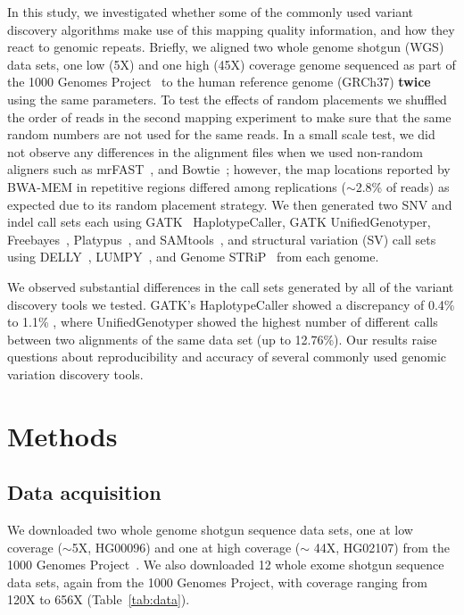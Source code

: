\documentclass[10pt,a4paper]{article}
\begin{document}
In this study, we investigated whether some of the commonly used variant discovery algorithms
make use of this mapping quality information, and how they react to genomic repeats.
Briefly, 
we aligned two whole genome shotgun (WGS) data sets, one low (5X) and one high (45X) coverage genome
sequenced as part of the 1000 Genomes Project~\cite{1000GP2012} to the human reference genome (GRCh37) {\bf twice} using the same parameters. 
To test the effects of random placements 
we shuffled the order of reads in the second mapping experiment to make sure that the same random numbers are not used for the same reads. 
In a small scale test, we did not observe any differences
in the alignment files when we used non-random aligners such as mrFAST~\cite{Alkan2009,Xin2013}, and Bowtie~\cite{Langmead2009}; however, 
the map locations reported by BWA-MEM in repetitive regions differed among replications ($\sim$2.8\% of reads) as expected due to its random placement strategy.
We then generated two SNV and indel call sets each using GATK~\cite{DePristo2011} HaplotypeCaller, GATK UnifiedGenotyper, Freebayes~\cite{Garrison2012}, Platypus~\cite{Rimmer2014}, and SAMtools~\cite{Li2009b}, and structural variation (SV) call sets using DELLY~\cite{Rausch2012}, LUMPY~\cite{Layer2014}, and Genome STRiP~\cite{Handsaker2011,Handsaker2015} from each genome.

We observed substantial differences in the call sets generated by all of the variant discovery tools we tested. GATK's HaplotypeCaller showed a discrepancy of 0.4\% to 1.1\% , 
where UnifiedGenotyper showed the highest number of different calls between two alignments of the same data set (up to 12.76\%). 
Our results raise questions about reproducibility and accuracy of several commonly used genomic variation discovery tools. 



\section{Methods}

\subsection{Data acquisition}
We downloaded two whole genome shotgun sequence data sets, one at low coverage ($\sim$5X, HG00096) and one at high coverage ($\sim$ 44X, HG02107) from the 1000 Genomes Project~\cite{1000GP2012}.
We also downloaded 12 whole exome shotgun sequence data sets, again from the 1000 Genomes Project, with coverage ranging from 120X to 656X (Table~\ref{tab:data}). 
\end{document}
